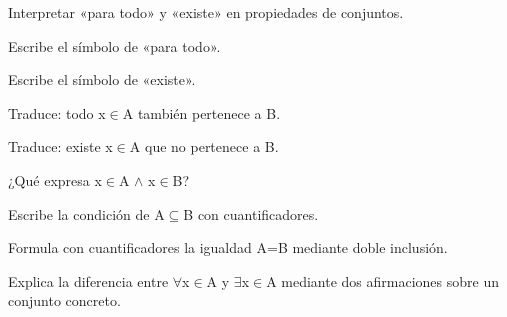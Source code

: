 \begin{lesson}[id=dia-25-lectura,weight=0]

Interpretar «para todo» y «existe» en propiedades de conjuntos.

\end{lesson}

\begin{activity}[id=dia-25-corta-01,type=short,weight=1]

Escribe el símbolo de «para todo».

\end{activity}

\begin{activity}[id=dia-25-corta-02,type=short,weight=1]

Escribe el símbolo de «existe».

\end{activity}

\begin{activity}[id=dia-25-corta-03,type=short,weight=1]

Traduce: todo x\(\in\)A también pertenece a B.

\end{activity}

\begin{activity}[id=dia-25-corta-04,type=short,weight=1]

Traduce: existe x\(\in\)A que no pertenece a B.

\end{activity}

\begin{activity}[id=dia-25-corta-05,type=short,weight=1]

¿Qué expresa x\(\in\)A \(\land\) x\(\in\)B?

\end{activity}

\begin{activity}[id=dia-25-corta-06,type=short,weight=1]

Escribe la condición de A\(\subseteq\)B con cuantificadores.

\end{activity}

\begin{activity}[id=dia-25-desarrollo-01,type=long,weight=2]

Formula con cuantificadores la igualdad A=B mediante doble inclusión.

\end{activity}

\begin{activity}[id=dia-25-desarrollo-02,type=long,weight=2]

Explica la diferencia entre \(\forall\)x\(\in\)A y \(\exists\)x\(\in\)A mediante dos afirmaciones sobre un conjunto concreto.

\end{activity}

